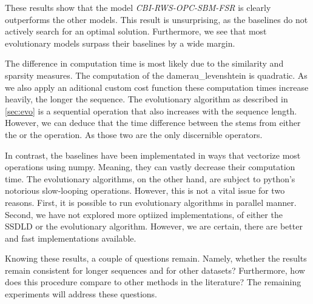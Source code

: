 \documentclass[./../../paper.tex]{subfiles}
\begin{document}
These results show that the model \emph{CBI-RWS-OPC-SBM-FSR} is clearly outperforms the other models. This result is unsurprising, as the baselines do not actively search for an optimal solution. Furthermore, we see that most evolutionary models surpass their baselines by a wide margin. 

The difference in computation time is most likely due to the similarity and sparsity measures. The computation of the \gls{damerau_levenshtein} is quadratic. As we also apply an aditional custom cost function these computation times increase heavily, the longer the sequence. The evolutionary algorithm as described in \autoref{sec:evo} is a sequential operation that also increases with the sequence length. However, we can deduce that the time difference between the  stems from either the  or the  operation. As those two are the only discernible operators. 

In contrast, the baselines have been implementated in ways that vectorize most operations using numpy. Meaning, they can vastly decrease their computation time. The evolutionary algorithms, on the other hand, are subject to python's notorious slow-looping operations. However, this is not a vital issue for two reasons. First, it is possible to run evolutionary algorithms in parallel manner. Second, we have not explored more optiized implementations, of either the \gls{SSDLD} or the evolutionary algorithm. However, we are certain, there are better and fast implementations available. 

Knowing these results, a couple of questions remain. Namely, whether the results remain consistent for longer sequences and for other datasets? Furthermore, how does this procedure compare to other methods in the literature? The remaining experiments will address these questions. 
\end{document}
